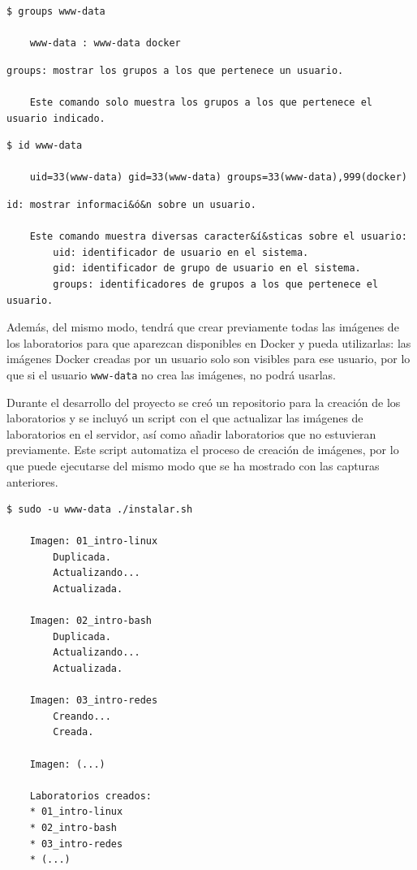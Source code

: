         \begin{lstlisting}[style=bash_style]
    $ groups www-data

    www-data : www-data docker
        \end{lstlisting}

        \begin{lstlisting}[style=comment_style]
    groups: mostrar los grupos a los que pertenece un usuario.

    Este comando solo muestra los grupos a los que pertenece el usuario indicado.
        \end{lstlisting}

        \begin{lstlisting}[style=bash_style]
    $ id www-data

    uid=33(www-data) gid=33(www-data) groups=33(www-data),999(docker)
        \end{lstlisting}

        \begin{lstlisting}[style=comment_style]
    id: mostrar informaci&ó&n sobre un usuario.

    Este comando muestra diversas caracter&í&sticas sobre el usuario:
        uid: identificador de usuario en el sistema.
        gid: identificador de grupo de usuario en el sistema.
        groups: identificadores de grupos a los que pertenece el usuario.
        \end{lstlisting}

        Además, del mismo modo, tendrá que crear previamente todas las imágenes de los laboratorios para que aparezcan disponibles en Docker y pueda utilizarlas: las imágenes Docker creadas por un usuario solo son visibles para ese usuario, por lo que si el usuario \texttt{www-data} no crea las imágenes, no podrá usarlas.

        Durante el desarrollo del proyecto se creó un repositorio para la creación de los laboratorios y se incluyó un script con el que actualizar las imágenes de laboratorios en el servidor, así como añadir laboratorios que no estuvieran previamente. Este script automatiza el proceso de creación de imágenes, por lo que puede ejecutarse del mismo modo que se ha mostrado con las capturas anteriores.
        \\

        \begin{lstlisting}[style=bash_style]
    $ sudo -u www-data ./instalar.sh

    Imagen: 01_intro-linux
        Duplicada.
        Actualizando...
        Actualizada.

    Imagen: 02_intro-bash
        Duplicada.
        Actualizando...
        Actualizada.

    Imagen: 03_intro-redes
        Creando...
        Creada.

    Imagen: (...)

    Laboratorios creados:
    * 01_intro-linux
    * 02_intro-bash
    * 03_intro-redes
    * (...)
        \end{lstlisting}

